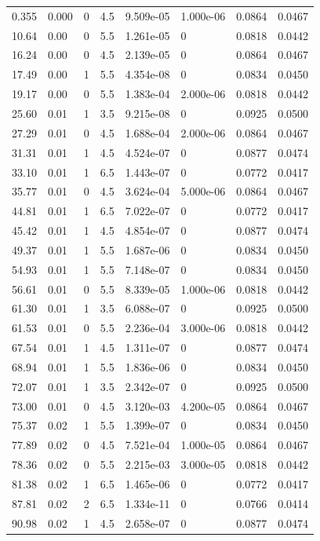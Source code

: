 \documentclass[preview]{standalone}
\begin{document}
{{\begin{tabular}{L{1.2cm}C{1.2cm} C{0.3cm}C{0.5cm} C{1.4cm}C{1.4cm} C{1.4cm}C{1.4cm}}
  0.355  &  0.000  & 0     & 4.5 &  9.509e-05  & 1.000e-06  & 0.0864 &  0.0467   \\ 
  10.64  &  0.00  & 0     & 5.5 &  1.261e-05  & 0  & 0.0818 &  0.0442   \\ 
  16.24  &  0.00  & 0     & 4.5 &  2.139e-05  & 0  & 0.0864 &  0.0467   \\ 
  17.49  &  0.00  & 1     & 5.5 &  4.354e-08  & 0  & 0.0834 &  0.0450   \\ 
  19.17  &  0.00  & 0     & 5.5 &  1.383e-04  & 2.000e-06  & 0.0818 &  0.0442   \\ 
  25.60  &  0.01  & 1     & 3.5 &  9.215e-08  & 0  & 0.0925 &  0.0500   \\ 
  27.29  &  0.01  & 0     & 4.5 &  1.688e-04  & 2.000e-06  & 0.0864 &  0.0467   \\ 
  31.31  &  0.01  & 1     & 4.5 &  4.524e-07  & 0  & 0.0877 &  0.0474   \\ 
  33.10  &  0.01  & 1     & 6.5 &  1.443e-07  & 0  & 0.0772 &  0.0417   \\ 
  35.77  &  0.01  & 0     & 4.5 &  3.624e-04  & 5.000e-06  & 0.0864 &  0.0467   \\ 
  44.81  &  0.01  & 1     & 6.5 &  7.022e-07  & 0  & 0.0772 &  0.0417   \\ 
  45.42  &  0.01  & 1     & 4.5 &  4.854e-07  & 0  & 0.0877 &  0.0474   \\ 
  49.37  &  0.01  & 1     & 5.5 &  1.687e-06  & 0  & 0.0834 &  0.0450   \\ 
  54.93  &  0.01  & 1     & 5.5 &  7.148e-07  & 0  & 0.0834 &  0.0450   \\ 
  56.61  &  0.01  & 0     & 5.5 &  8.339e-05  & 1.000e-06  & 0.0818 &  0.0442   \\ 
  61.30  &  0.01  & 1     & 3.5 &  6.088e-07  & 0  & 0.0925 &  0.0500   \\ 
  61.53  &  0.01  & 0     & 5.5 &  2.236e-04  & 3.000e-06  & 0.0818 &  0.0442   \\ 
  67.54  &  0.01  & 1     & 4.5 &  1.311e-07  & 0  & 0.0877 &  0.0474   \\ 
  68.94  &  0.01  & 1     & 5.5 &  1.836e-06  & 0  & 0.0834 &  0.0450   \\ 
  72.07  &  0.01  & 1     & 3.5 &  2.342e-07  & 0  & 0.0925 &  0.0500   \\ 
  73.00  &  0.01  & 0     & 4.5 &  3.120e-03  & 4.200e-05  & 0.0864 &  0.0467   \\ 
  75.37  &  0.02  & 1     & 5.5 &  1.399e-07  & 0  & 0.0834 &  0.0450   \\ 
  77.89  &  0.02  & 0     & 4.5 &  7.521e-04  & 1.000e-05  & 0.0864 &  0.0467   \\ 
  78.36  &  0.02  & 0     & 5.5 &  2.215e-03  & 3.000e-05  & 0.0818 &  0.0442   \\ 
  81.38  &  0.02  & 1     & 6.5 &  1.465e-06  & 0  & 0.0772 &  0.0417   \\ 
  87.81  &  0.02  & 2     & 6.5 &  1.334e-11  & 0  & 0.0766 &  0.0414   \\ 
  90.98  &  0.02  & 1     & 4.5 &  2.658e-07  & 0  & 0.0877 &  0.0474   \\ 
\hline 
\end{tabular} 

}}
\end{document}
